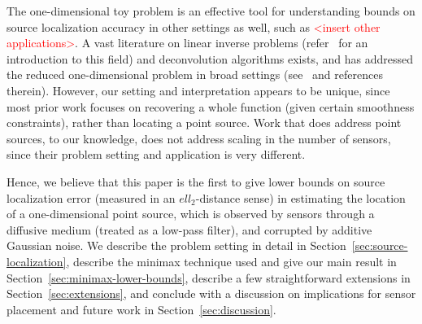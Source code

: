 \documentclass[conference]{IEEEtran}
\begin{document}
The one-dimensional toy problem is an effective tool for understanding bounds
on source localization accuracy in other settings as well, such as
\textcolor{red}{<insert other applications>}. A vast literature on linear
inverse problems (refer~\cite{Bal2012Introduction} for an introduction to this
field) and deconvolution algorithms exists, and has addressed the reduced
one-dimensional problem in broad settings
(see~\cite{Cavalier2002Sharp,Efromovich1997Robust,Ibragimov1981Statistical} and
references therein). However, our setting and interpretation appears to be
unique, since most prior work focuses on recovering a whole function (given
certain smoothness constraints), rather than locating a point source. Work that
does address point sources, to our knowledge, does not address scaling in the
number of sensors, since their problem setting and application is very
different.

Hence, we believe that this paper is the first to give lower bounds on source
localization error (measured in an $ell_2$-distance sense) in estimating the
location of a one-dimensional point source, which is observed by sensors
through a diffusive medium (treated as a low-pass filter), and corrupted by
additive Gaussian noise. We describe the problem setting in detail in
Section~\ref{sec:source-localization}, describe the minimax technique used and
give our main result in Section~\ref{sec:minimax-lower-bounds}, describe a few
straightforward extensions in Section~\ref{sec:extensions}, and conclude with a
discussion on implications for sensor placement and future work in
Section~\ref{sec:discussion}.



\end{document}
